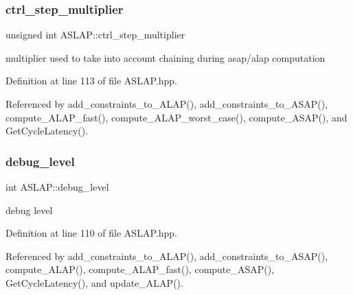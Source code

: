 \mbox{\label{classASLAP_a05235b4e84d76843372f10005b4be5ea}} 
\subsubsection{\texorpdfstring{ctrl\+\_\+step\+\_\+multiplier}{ctrl\_step\_multiplier}}
{\footnotesize\ttfamily unsigned int A\+S\+L\+A\+P\+::ctrl\+\_\+step\+\_\+multiplier\hspace{0.3cm}{\ttfamily [private]}}



multiplier used to take into account chaining during asap/alap computation 



Definition at line 113 of file A\+S\+L\+A\+P.\+hpp.



Referenced by add\+\_\+constraints\+\_\+to\+\_\+\+A\+L\+A\+P(), add\+\_\+constraints\+\_\+to\+\_\+\+A\+S\+A\+P(), compute\+\_\+\+A\+L\+A\+P\+\_\+fast(), compute\+\_\+\+A\+L\+A\+P\+\_\+worst\+\_\+case(), compute\+\_\+\+A\+S\+A\+P(), and Get\+Cycle\+Latency().

\mbox{\label{classASLAP_a733320650c283a3fb57e0053495e62a9}} 
\subsubsection{\texorpdfstring{debug\+\_\+level}{debug\_level}}
{\footnotesize\ttfamily int A\+S\+L\+A\+P\+::debug\+\_\+level\hspace{0.3cm}{\ttfamily [private]}}



debug level 



Definition at line 110 of file A\+S\+L\+A\+P.\+hpp.



Referenced by add\+\_\+constraints\+\_\+to\+\_\+\+A\+L\+A\+P(), add\+\_\+constraints\+\_\+to\+\_\+\+A\+S\+A\+P(), compute\+\_\+\+A\+L\+A\+P(), compute\+\_\+\+A\+L\+A\+P\+\_\+fast(), compute\+\_\+\+A\+S\+A\+P(), Get\+Cycle\+Latency(), and update\+\_\+\+A\+L\+A\+P().

